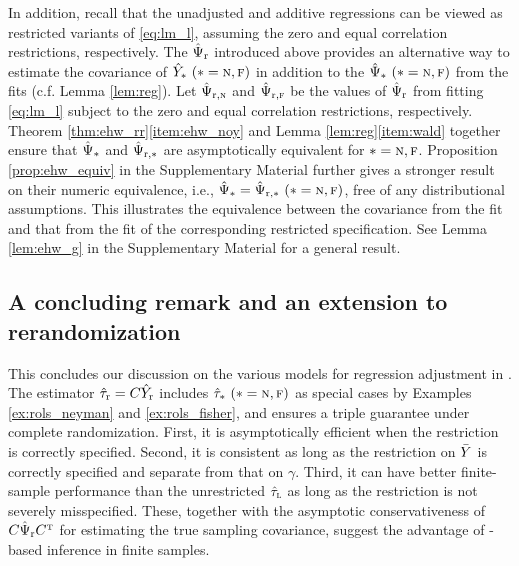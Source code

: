 \documentclass[11pt]{article}
\theoremstyle{definition}
\begin{document}
In addition, recall that the unadjusted and additive regressions can be viewed as restricted variants of \eqref{eq:lm_l}, assuming the zero and equal correlation restrictions, respectively.  
The $\hat\Psi_{\textup{r}}$ introduced above provides an alternative way to estimate the covariance of $\hat Y_* \ (* = \textsc{n}, \textsc{f})$ in addition to the $\hat\Psi_* \ (* = \textsc{n}, \textsc{f})$ from the \olss fits (c.f. Lemma \ref{lem:reg}).
Let $ \hat\Psi_{\textup{r},\textsc{n}}$ and $ \hat\Psi_{\textup{r},\textsc{f}}$ be the values of $\hat\Psi_{\textup{r}}$ from fitting \eqref{eq:lm_l} subject to the zero and equal correlation restrictions, respectively. 
Theorem \ref{thm:ehw_rr}\eqref{item:ehw_noy} and Lemma \ref{lem:reg}\eqref{item:wald} together ensure that $\hat\Psi_*$ and $\hat\Psi_{\textup{r},*}$ are asymptotically equivalent for $* = \textsc{n}, \textsc{f}$.
Proposition \ref{prop:ehw_equiv} in the Supplementary Material further gives a stronger result on their numeric equivalence, i.e., $\hsis=\hsrs \ (\nf)$,  free of any distributional assumptions.
This illustrates the equivalence between the \ehws covariance from the \rlss fit and that from the \olss fit of the corresponding restricted specification. See Lemma \ref{lem:ehw_g} in the Supplementary Material for a general result.




\subsection{ A concluding remark and an extension to rerandomization}\label{sec:rem_rmk}


This concludes our discussion on the various models for regression adjustment in \mes.
The \rolss estimator $\hat\tau_{{\textup{r}} } = C \hat Y_{\textup{r}} $ includes $\hat\tau_* \ (* = \textsc{n}, \textsc{f})$ as special cases by Examples \ref{ex:rols_neyman} and \ref{ex:rols_fisher}, and ensures a triple guarantee under complete randomization. First, it is asymptotically efficient when the restriction is correctly specified. Second, it is consistent as long as the restriction on $\bar Y$ is correctly specified and separate from that on $\gamma$. Third, it can have better finite-sample performance than  the unrestricted $\hat\tau_{\textsc{l}}$ as long as the restriction is not severely misspecified. These, together with the asymptotic conservativeness of $C\hat\Psi_{\textup{r}} C^{ \mathrm{\scriptscriptstyle T} }$ for estimating the true sampling covariance,  suggest the advantage of \rls-based inference in finite samples.
\end{document}
